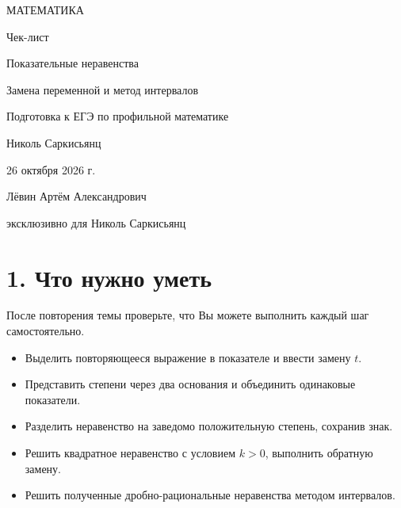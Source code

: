 \documentclass[a4paper,12pt]{article}
\newcommand{\sect}[1]{\section*{\color{darkaccent}#1}}
\begin{document}
\thispagestyle{empty}
\begin{center}
  \vspace*{13mm}
  {\large\color{darkaccent} МАТЕМАТИКА\par}
  \vspace{10mm}
  {\fontsize{26}{30}\selectfont\color{ink} Чек-лист\par}
  \vspace{9mm}
  {\fontsize{22}{27}\selectfont\color{accent} Показательные неравенства\par}
  \vspace{6mm}
  {\Large\color{accent} Замена переменной и метод интервалов\par}
  \vspace{12mm}
  {\large\color{ink} Подготовка к ЕГЭ по профильной математике\par}
  \vfill
  {\large Николь Саркисьянц\par}
  \vspace{8mm}
  {\large 26 октября 2026 г.\par}
  \vspace{11mm}
  {\normalsize Лёвин Артём Александрович\par}
  {\normalsize эксклюзивно для Николь Саркисьянц\par}
  \vspace{10mm}
  \vspace{2mm}
\end{center}
\clearpage

\sect{1. Что нужно уметь}
После повторения темы проверьте, что Вы можете выполнить каждый шаг самостоятельно.
\begin{itemize}[label=$\square$,leftmargin=9mm]
  \item Выделить повторяющееся выражение в показателе и ввести замену $t$.
  \item Представить степени через два основания и объединить одинаковые показатели.
  \item Разделить неравенство на заведомо положительную степень, сохранив знак.
  \item Решить квадратное неравенство с условием $k>0$, выполнить обратную замену.
  \item Решить полученные дробно-рациональные неравенства методом интервалов.
\end{itemize}
\end{document}
